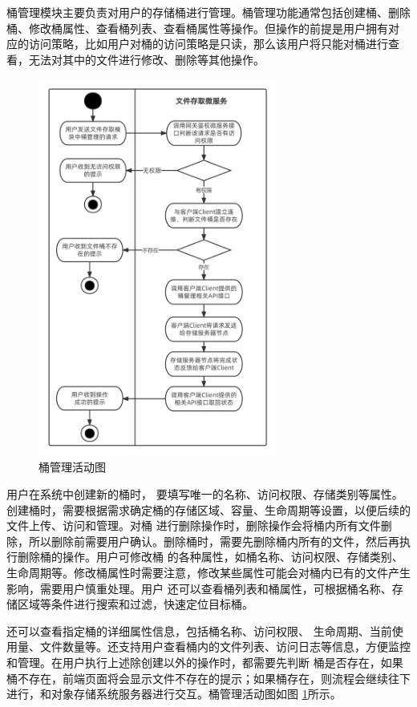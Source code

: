 桶管理模块主要负责对用户的存储桶进行管理。桶管理功能通常包括创建桶、删除桶、修改桶属性、查看桶列表、查看桶属性等操作。但操作的前提是用户拥有对
应的访问策略，比如用户对桶的访问策略是只读，那么该用户将只能对桶进行查看，无法对其中的文件进行修改、删除等其他操作。
\begin{figure}[htb]
    \centering
    \includegraphics[width=0.7\textwidth]{my_figures/chapter4/桶管理活动图.png}
    \caption{桶管理活动图}
    \label{fig:桶管理活动图}
\end{figure}

用户在系统中创建新的桶时，
要填写唯一的名称、访问权限、存储类别等属性。创建桶时，需要根据需求确定桶的存储区域、容量、生命周期等设置，以便后续的文件上传、访问和管理。对桶
进行删除操作时，删除操作会将桶内所有文件删除，所以删除前需要用户确认。删除桶时，需要先删除桶内所有的文件，然后再执行删除桶的操作。用户可修改桶
的各种属性，如桶名称、访问权限、存储类别、生命周期等。修改桶属性时需要注意，修改某些属性可能会对桶内已有的文件产生影响，需要用户慎重处理。用户
还可以查看桶列表和桶属性，可根据桶名称、存储区域等条件进行搜索和过滤，快速定位目标桶。

还可以查看指定桶的详细属性信息，包括桶名称、访问权限、
生命周期、当前使用量、文件数量等。还支持用户查看桶内的文件列表、访问日志等信息，方便监控和管理。在用户执行上述除创建以外的操作时，都需要先判断
桶是否存在，如果桶不存在，前端页面将会显示文件不存在的提示；如果桶存在，则流程会继续往下进行，和对象存储系统服务器进行交互。桶管理活动图如图
\ref{fig:桶管理活动图}所示。




